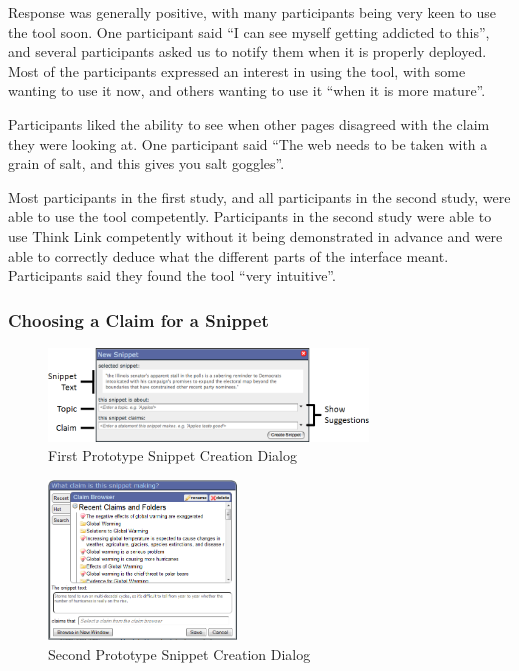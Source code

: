 \documentclass{chi2009}
\begin{document}
Response was generally positive, with many participants being very keen to use the tool soon. 
One participant said ``I can see myself getting addicted to this'', and several participants asked us to notify them when it is properly deployed.  %
Most of the participants expressed an interest in using the tool, with some wanting to use it now, and others wanting to use it ``when it is more mature''.

Participants liked the ability to see when other pages disagreed with the claim they were looking at. One participant said ``The web needs to be taken with a grain of salt, and this gives you salt goggles''.

Most participants in the first study, and all participants in the second study, were able to use the tool competently.  %
Participants in the second study were able to use Think Link competently without it being demonstrated in advance and were able to correctly deduce what the different parts of the interface meant. Participants said they found the tool ``very intuitive''.

\subsubsection{Choosing a Claim for a Snippet}

\begin{figure}[t]
	\includegraphics[width=8.5cm]{../screenshots/oldsnipcreate_diagram.png}
	\caption{First Prototype Snippet Creation Dialog}
	\label{oldsnippetbox}
\end{figure}

\begin{figure}[t]
\begin{center}
	\includegraphics[width=5cm]{../screenshots/newsnip_browseopen.png}
	\caption{Second Prototype Snippet Creation Dialog}
	\label{secondsnippetbox}
\end{center}
\end{figure}
\end{document}
